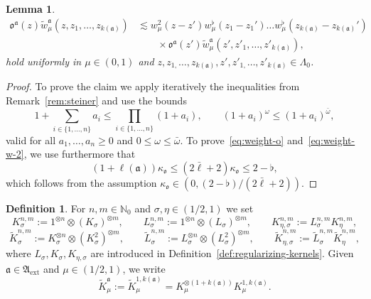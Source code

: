 \documentclass{article}
\numberwithin{equation}{section}
\newcommand{\assign}{:=}
\theoremstyle{plain}
\newtheorem{lemma}[theorem]{Lemma}
\theoremstyle{definition}
\newtheorem{definition}[theorem]{Definition}
\begin{document}
\begin{lemma}
\begin{equation}
    \label{eq:weight-w-2}
  \end{equation}
  \begin{equation}
    \begin{aligned}
      \mathfrak{o}^{\mathfrak{a}} (z)
      \tilde{w}^{\mathfrak{a}}_{\mu} (z, z_1, \ldots, z_{k (\mathfrak{a})})
      &\lesssim w^2_{\mu} (z - z') w^{\flat}_{\mu}
      (z_1 - z_1') \ldots w^{\flat}_{\mu} (z_{k (\mathfrak{a})}
      - z_{k (\mathfrak{a})}') \\
      &\qquad \times
      \mathfrak{o}^{\mathfrak{a}} (z')
      \tilde{w}^{\mathfrak{a}}_{\mu} (z', z'_1, \ldots, z'_{k (\mathfrak{a})}),
    \end{aligned}
    \label{eq:weight-w-o-2}
  \end{equation}
  hold uniformly in $\mu \in (0, 1)$ and $z, z_{1,} \ldots, z_{k
  (\mathfrak{a})}, z', z'_{1,} \ldots, z'_{k (\mathfrak{a})} \in \Lambda_0$.
\end{lemma}

\begin{proof}
  To prove the claim we apply iteratively the inequalities from
  Remark~\ref{rem:steiner} and use the bounds
  \[ 1 + \sum_{i \in \{ 1, \ldots, n \}} a_i \leqslant \prod_{i \in \{ 1,
     \ldots, n \}} (1 + a_i), \qquad (1 + a_i)^{\omega} \leqslant (1 +
     a_i)^{\bar{\omega}}, \]
  valid for all $a_1, \ldots, a_n \geqslant 0$ and $0 \leqslant \omega
  \leqslant \bar{\omega}$. To prove~\eqref{eq:weight-o}
  and~\eqref{eq:weight-w-2}, we use furthermore that
  \[ (1 + \ell (\mathfrak{a})) \kappa_{\mathfrak{o}} \leqslant (2
     \bar{\ell} + 2) \kappa_{\mathfrak{o}} \leqslant  2 - \flat, \]
  which follows from the assumption $\kappa_{\mathfrak{o}} \in
  (0, (2-\flat) / (2 \bar{\ell} + 2))$.
\end{proof}

\begin{definition}
  \label{def:regularizing-kernels-for-kernels}For $n, m \in \mathbb{N}_0$ and
  $\sigma, \eta \in (1 / 2, 1)$ we set
  \[ K^{n, m}_{\sigma} \assign 1^{\otimes n} \otimes (K_{\sigma})^{\otimes m},
     \qquad L_{\sigma}^{n, m} \assign 1^{\otimes n} \otimes
     (L_{\sigma})^{\otimes m}, \qquad K^{n, m}_{\eta, \sigma} \assign
     L_{\sigma}^{n, m} K^{n, m}_{\eta}, \]
  \[ \tilde{K}^{n, m}_{\sigma} \assign K^{\otimes n}_{\sigma} \otimes
     (K^2_{\sigma})^{\otimes m}, \qquad \tilde{L}_{\sigma}^{n, m} \assign
     L_{\sigma}^{\otimes n} \otimes (L^2_{\sigma})^{\otimes m}, \qquad
     \tilde{K}^{n, m}_{\eta, \sigma} \assign \tilde{L}_{\sigma}^{n, m} 
     \tilde{K}^{n, m}_{\eta}, \]
  where $L_{\sigma}, K_{\sigma}, K_{\eta, \sigma}$ are introduced in
  Definition~\ref{def:regularizing-kernels}. Given $\mathfrak{a} \in
  \mathfrak{A}_{\mathrm{ext}}$ and $\mu\in (1/2,1)$,
  we write
  \[ \tilde{K}^{\mathfrak{a}}_{\mu} \assign \tilde{K}^{1, k
     (\mathfrak{a})}_{\mu} = K_{\mu}^{\otimes (1 + k (\mathfrak{a}))} K^{1, k
     (\mathfrak{a})}_{\mu} . \]
\end{definition}
\end{document}
